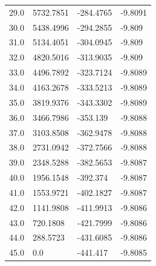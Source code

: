 \begin{table}[H]
\begin{tabular}{llll}
29.0 & 5732.7851 & -284.4765 & -9.8091 \\
30.0 & 5438.4996 & -294.2855 & -9.809 \\
31.0 & 5134.4051 & -304.0945 & -9.809 \\
32.0 & 4820.5016 & -313.9035 & -9.809 \\
33.0 & 4496.7892 & -323.7124 & -9.8089 \\
34.0 & 4163.2678 & -333.5213 & -9.8089 \\
35.0 & 3819.9376 & -343.3302 & -9.8089 \\
36.0 & 3466.7986 & -353.139 & -9.8088 \\
37.0 & 3103.8508 & -362.9478 & -9.8088 \\
38.0 & 2731.0942 & -372.7566 & -9.8088 \\
39.0 & 2348.5288 & -382.5653 & -9.8087 \\
40.0 & 1956.1548 & -392.374 & -9.8087 \\
41.0 & 1553.9721 & -402.1827 & -9.8087 \\
42.0 & 1141.9808 & -411.9913 & -9.8086 \\
43.0 & 720.1808 & -421.7999 & -9.8086 \\
44.0 & 288.5723 & -431.6085 & -9.8086 \\
45.0 & 0.0 & -441.417 & -9.8085 \\
\bottomrule
\end{tabular}

\end{table}

